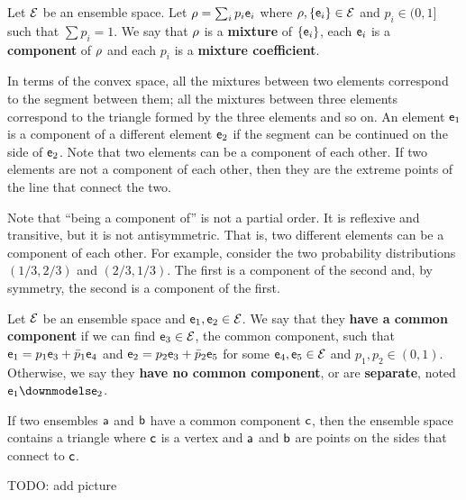 \begin{defn}
	Let $\Ens$ be an ensemble space. Let $\ens[\rho] = \sum_i p_i \ens_i$ where $\ens[\rho], \{\ens_i\} \in \Ens$ and $p_i \in (0,1]$ such that $\sum p_i = 1$. We say that $\ens[\rho]$ is a \textbf{mixture} of $\{\ens_i\}$, each $\ens_i$ is a \textbf{component} of $\ens[\rho]$ and each $p_i$ is a \textbf{mixture coefficient}.
\end{defn}

\begin{remark}
	In terms of the convex space, all the mixtures between two elements correspond to the segment between them; all the mixtures between three elements correspond to the triangle formed by the three elements and so on. An element $\ens_1$ is a component of a different element $\ens_2$ if the segment can be continued on the side of $\ens_2$. Note that two elements can be a component of each other. If two elements are not a component of each other, then they are the extreme points of the line that connect the two.
\end{remark}

\begin{remark}
	Note that ``being a component of'' is not a partial order. It is reflexive and transitive, but it is not antisymmetric. That is, two different elements can be a component of each other. For example, consider the two probability distributions $(1/3, 2/3)$ and $(2/3, 1/3)$. The first is a component of the second and, by symmetry, the second is a component of the first.
\end{remark}


\begin{defn}
	Let $\Ens$ be an ensemble space and $\ens_1, \ens_2 \in \Ens$. We say that they \textbf{have a common component} if we can find $\ens_3 \in \Ens$, the common component, such that $\ens_1 = p_1 \ens_3 + \bar{p}_1 \ens_4$ and $\ens_2 = p_2 \ens_3 + \bar{p}_2 \ens_5$ for some $\ens_4, \ens_5 \in \Ens$ and $p_1, p_2 \in (0,1)$. Otherwise, we say they \textbf{have no common component}, or are \textbf{separate}, noted $\ens_1 \separate \ens_2$.
\end{defn}

\begin{remark}
	If two ensembles $\ens[a]$ and $\ens[b]$ have a common component $\ens[c]$, then the ensemble space contains a triangle where $\ens[c]$ is a vertex and $\ens[a]$ and $\ens[b]$ are points on the sides that connect to $\ens[c]$.
	
	TODO: add picture
\end{remark}

